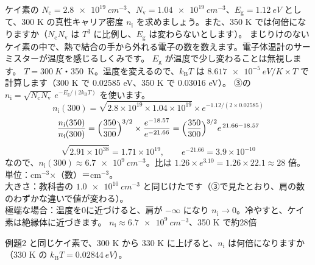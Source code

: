 \label{ph:原-9:ex2}
\begin{phreidai}
ケイ素の $N_{\mathrm c}=\qty{2.8e19}{cm^{-3}}$、$N_{\mathrm v}=\qty{1.04e19}{cm^{-3}}$、$E_{\mathrm g}=\qty{1.12}{eV}$ として、300 K の真性キャリア密度 $n_{\mathrm i}$ を求めましょう。また、350 K では何倍になりますか（$N_{\mathrm c}N_{\mathrm v}$ は $T^3$ に比例し、$E_{\mathrm g}$ は変わらないとします）。
\phbamen
まじりけのないケイ素の中で、熱で結合の手から外れる電子の数を数えます。電子体温計のサーミスターが温度を感じるしくみです。
\phmushi
$E_{\mathrm g}$ が温度で少し変わることは無視します。
\phzu
$T=\qty{300}{K}$・\qty{350}{K}。温度を変えるので、$k_{\mathrm B}T$ は $\qty{8.617e-5}{eV/K}\times T$ で計算します（300 K で 0.02585 eV、350 K で 0.03016 eV）。
\phriyu
③の $n_{\mathrm i}=\sqrt{N_{\mathrm c}N_{\mathrm v}}\,e^{-E_{\mathrm g}/(2k_{\mathrm B}T)}$ を使います。
\phtateru
\[ n_{\mathrm i}(300)=\sqrt{2.8\times10^{19}\times1.04\times10^{19}}\times e^{-1.12/(2\times0.02585)} \]
\[ \frac{n_{\mathrm i}(350)}{n_{\mathrm i}(300)}=\Bigl(\frac{350}{300}\Bigr)^{3/2}\times\frac{e^{-18.57}}{e^{-21.66}}=\Bigl(\frac{350}{300}\Bigr)^{3/2}e^{\,21.66-18.57} \]
\phtoku
\[ \sqrt{2.91\times10^{38}}=1.71\times10^{19},\qquad e^{-21.66}=3.9\times10^{-10} \]
なので、$n_{\mathrm i}(300)\approx\qty{6.7e9}{cm^{-3}}$。比は $1.26\times e^{3.10}=1.26\times22.1\approx28$ 倍。
\phtashikame
単位：cm$^{-3}$×（数）＝cm$^{-3}$。\\
大きさ：教科書の $\qty{1.0e10}{cm^{-3}}$ と同じけたです（③で見たとおり、肩の数のわずかな違いで値が変わる）。\\
極端な場合：温度を0に近づけると、肩が $-\infty$ になり $n_{\mathrm i}\to0$。冷やすと、ケイ素は絶縁体に近づきます。
\kotae $n_{\mathrm i}\approx\qty{6.7e9}{cm^{-3}}$、350 K で約28倍
\end{phreidai}
\begin{jibun}
例題2 と同じケイ素で、300 K から 330 K に上げると、$n_{\mathrm i}$ は何倍になりますか（330 K の $k_{\mathrm B}T=\qty{0.02844}{eV}$）。
\end{jibun}

